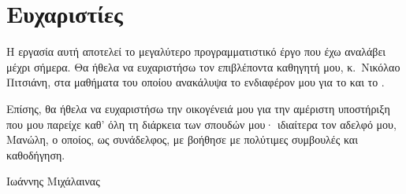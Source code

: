 \chapter*{Ευχαριστίες}
\label{ch:acknowledgements}

Η εργασία αυτή αποτελεί το μεγαλύτερο προγραμματιστικό έργο που έχω αναλάβει
μέχρι σήμερα. Θα ήθελα να ευχαριστήσω τον επιβλέποντα καθηγητή μου, κ.~Νικόλαο
Πιτσιάνη, στα μαθήματα του οποίου ανακάλυψα το ενδιαφέρον μου για το  και το .

Επίσης, θα ήθελα να ευχαριστήσω την οικογένειά μου για την αμέριστη υποστήριξη
που μου παρείχε καθ' όλη τη διάρκεια των σπουδών μου· ιδιαίτερα τον αδελφό μου,
Μανώλη, ο οποίος, ως συνάδελφος, με βοήθησε με πολύτιμες συμβουλές και
καθοδήγηση.

\vspace{1cm}
\begin{flushright}
    Ιωάννης Μιχάλαινας
\end{flushright}
